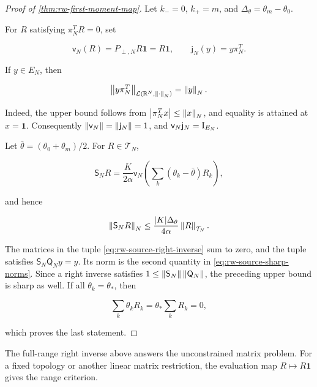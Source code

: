 \begin{proof}[Proof of \cref{thm:rw-first-moment-map}]
Let \(k_-=0\), \(k_+=m\), and
\(\Delta_\theta=\theta_m-\theta_0\).

For \(R\) satisfying \(\pi_N^TR=0\), set

\[
 \mathsf v_N(R)=P_{\perp,N}R\mathbf 1=R\mathbf 1,
 \qquad
 \mathsf j_N(y)=y\pi_N^T.
\]

If \(y\in E_N\), then

\begin{equation}
 \left\lVert y\pi_N^T\right\rVert_{\mathcal L(\mathbb R^N,\left\lVert\cdot\right\rVert_N)}=\left\lVert y\right\rVert_N.
 \label{eq:fredholm-rank-one-norm}
\end{equation}

Indeed, the upper bound follows from
\(\left\lvert\pi_N^Tx\right\rvert\le\left\lVert x\right\rVert_N\), and equality is attained at
\(x=\mathbf1\).  Consequently
\(\left\lVert\mathsf v_N\right\rVert=\left\lVert\mathsf j_N\right\rVert=1\), and
\(\mathsf v_N\mathsf j_N=\mathrm I_{E_N}\).

Let \(\bar\theta=(\theta_0+\theta_m)/2\).  For
\(R\in\mathcal T_N\),

\[
 \mathsf S_NR
 =\frac{K}{2\alpha}\mathsf v_N
       \left(\sum_k(\theta_k-\bar\theta)R_k\right),
\]

and hence

\[
 \left\lVert\mathsf S_NR\right\rVert_N
 \le\frac{|K|\Delta_\theta}{4\alpha}
      \left\lVert R\right\rVert_{\mathcal T_N}.
\]

The matrices in the tuple \cref{eq:rw-source-right-inverse} sum to zero,
and the tuple
satisfies \(\mathsf S_N\mathsf Q_Ny=y\).  Its norm is the second quantity
in \cref{eq:rw-source-sharp-norms}.  Since a right inverse satisfies
\(1\le\left\lVert\mathsf S_N\right\rVert\left\lVert\mathsf Q_N\right\rVert\), the preceding upper bound
is sharp as well.  If all \(\theta_k=\theta_*\), then

\[
 \sum_k\theta_kR_k=\theta_*\sum_kR_k=0,
\]

which proves the last statement.
\end{proof}

The full-range right inverse above answers the unconstrained matrix problem.
For a fixed topology or another linear matrix restriction, the evaluation
map \(R\mapsto R\mathbf1\) gives the range criterion.

